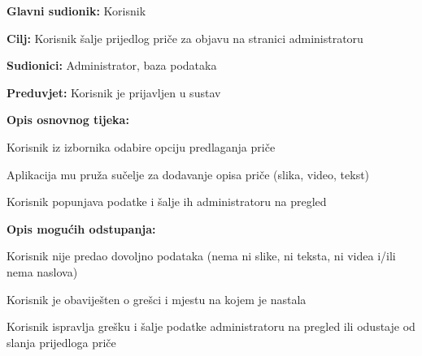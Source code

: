 						\noindent {}
					\begin{packed_item}
						
						\item \textbf{Glavni sudionik: }Korisnik
						\item  \textbf{Cilj:} Korisnik šalje prijedlog priče za objavu na stranici administratoru 
						\item  \textbf{Sudionici:} Administrator, baza podataka
						\item  \textbf{Preduvjet:} Korisnik je prijavljen u sustav
						\item  \textbf{Opis osnovnog tijeka:}
						
						\item[] \begin{packed_enum}
							
							\item Korisnik iz izbornika odabire opciju predlaganja priče
							\item Aplikacija mu pruža sučelje za dodavanje opisa priče (slika, video, tekst)
							\item Korisnik popunjava podatke i šalje ih administratoru na pregled
						\end{packed_enum}
						
						\item  \textbf{Opis mogućih odstupanja:}
						
						\item[] \begin{packed_item}
							
							\item[2.a] Korisnik nije predao dovoljno podataka (nema ni slike, ni teksta, ni videa i/ili nema naslova) 
							\item[] \begin{packed_enum}
								
								\item Korisnik je obaviješten o grešci i mjestu na kojem je nastala
								\item Korisnik ispravlja grešku i šalje podatke administratoru na pregled ili odustaje od slanja prijedloga priče								
							\end{packed_enum}			
						\end{packed_item}
					\end{packed_item}
				
